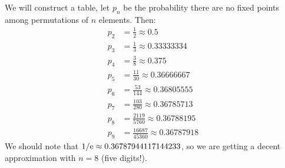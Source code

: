 We will construct a table, let $p_{n}$ be the probability there are no
fixed points among permutations of $n$ elements. Then:
\begin{equation}
\begin{split}
p_2 &= \frac{1}{2} \approx 0.5\\
p_3 &= \frac{1}{3} \approx 0.33333334\\
p_4 &= \frac{3}{8} \approx 0.375\\
p_5 &= \frac{11}{30} \approx 0.36666667\\
p_6 &= \frac{53}{144} \approx 0.36805555\\ 
p_7 &= \frac{103}{280} \approx 0.36785713\\ 
p_8 &= \frac{2119}{5760} \approx 0.36788195\\ 
p_9 &= \frac{16687}{45360} \approx 0.36787918
\end{split}
\end{equation}
We should note that $1/\mathrm{e}\approx 0.36787944117144233$, so we are getting
a decent approximation with $n=8$ (five digits!).
